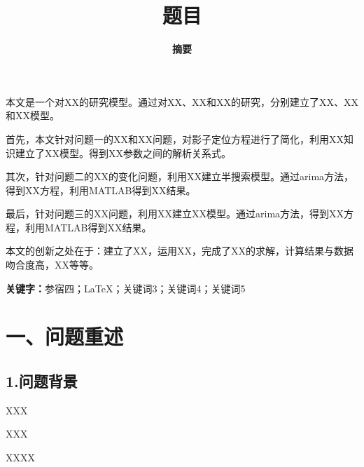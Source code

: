\documentclass[12pt,a4paper]{article}
\title{\textbf{题目}} %
\author{\textbf{摘要}}
\date{}
\begin{document}
	\thispagestyle{empty}
	 
	\thispagestyle{empty}
	\newpage
	
	\maketitle %
	\thispagestyle{empty}%
	\vspace{-1.5em}
\begin{spacing}{1.2}
	\sloppy{}%
	本文是一个对XX的研究模型。通过对XX、XX和XX的研究，分别建立了XX、XX和XX模型。
\end{spacing}
\begin{spacing}{1.2}
	\sloppy{}
	首先，本文针对问题一的XX和XX问题，对影子定位方程进行了简化，利用XX知识建立了XX模型。得到XX参数之间的解析关系式。
\end{spacing}
\begin{spacing}{1.2}
	\sloppy{}
	其次，针对问题二的XX的变化问题，利用XX建立半搜索模型。通过arima方法，得到XX方程，利用MATLAB得到XX结果。
\end{spacing}
\begin{spacing}{1.2}
	\sloppy{}
	最后，针对问题三的XX问题，利用XX建立XX模型。通过arima方法，得到XX方程，利用MATLAB得到XX结果。
\end{spacing}
\begin{spacing}{1.2}
	\sloppy{}
	本文的创新之处在于：建立了XX，运用XX，完成了XX的求解，计算结果与数据吻合度高，XX等等。
\end{spacing}

\textbf{关键字：}参宿四；\LaTeX；关键词3；关键词4；关键词5
\newpage
\setcounter{page}{1}%

\titleformat{\section}{\centering\large\bfseries}{}{}{}

\section*{一、问题重述}

\subsection*{1.问题背景}
\begin{spacing}{1.2}
	XXX
\end{spacing}
\begin{spacing}{1.2}
	XXX
\end{spacing}
\begin{spacing}{1.2}
	XXXX
\end{spacing}\vspace{-1.0em}
\end{document}
